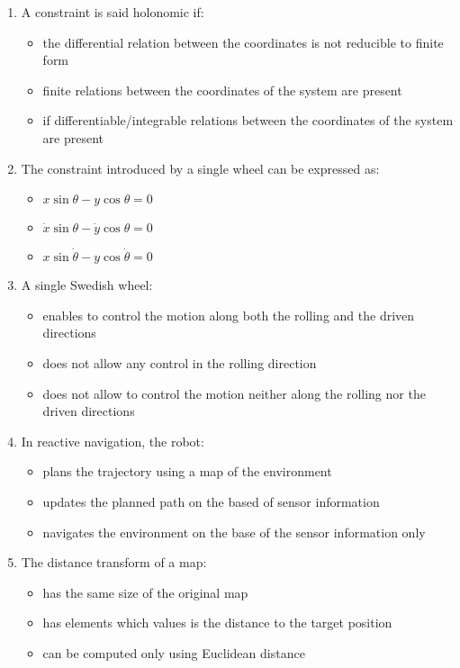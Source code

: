 \documentclass[openany]{book}
\theoremstyle{definition}
\theoremstyle{remark}
\begin{document}
\begin{enumerate}
    \item A constraint is said holonomic if:
    \begin{itemize}
        \item[] the differential relation between the coordinates is not reducible to finite form
        \item[\checkmark] finite relations between the coordinates of the system are present
        \item[\checkmark] if differentiable/integrable relations between the coordinates of the system are present
    \end{itemize}

    \item The constraint introduced by a single wheel can be expressed as:
    \begin{itemize}
        \item[] $x\sin\theta - y\cos\theta = 0$
        \item[\checkmark] $\dot{x}\sin\theta - \dot{y}\cos\theta = 0$
        \item[] $x\sin\dot{\theta} - y\cos\dot{\theta} = 0$
    \end{itemize}

    \item A single Swedish wheel:
    \begin{itemize}
        \item[] enables to control the motion along both the rolling and the driven directions
        \item[\checkmark] does not allow any control in the rolling direction
        \item[] does not allow to control the motion neither along the rolling nor the driven directions
    \end{itemize}

    \item In reactive navigation, the robot:
    \begin{itemize}
        \item[] plans the trajectory using a map of the environment
        \item[] updates the planned path on the based of sensor information
        \item[\checkmark] navigates the environment on the base of the sensor information only
    \end{itemize}

    \item The distance transform of a map:
    \begin{itemize}
        \item[\checkmark] has the same size of the original map
        \item[\checkmark] has elements which values is the distance to the target position
        \item[] can be computed only using Euclidean distance
    \end{itemize}


\end{enumerate}
\end{document}
